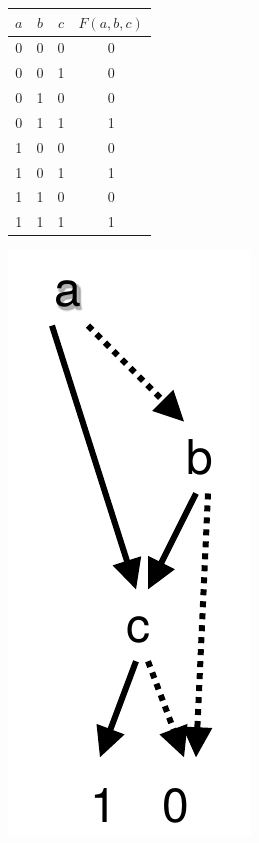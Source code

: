 \begin{container-fluid}
\begin{row-fluid}
\begin{span9}
\begin{center}
\begin{tabular}{|ccc|c|}
$a$ & $b$ & $c$ & $F(a,b,c)$\\
\hline
0 & 0 & 0 & 0\\
0 & 0 & 1 & 0\\
0 & 1 & 0 & 0\\
0 & 1 & 1 & 1\\
1 & 0 & 0 & 0\\
1 & 0 & 1 & 1\\
1 & 1 & 0 & 0\\
1 & 1 & 1 & 1\\
\end{tabular}
\end{center}
\end{span9}
\begin{span3}
\includegraphics{img/static/dd-dd.png}
\end{span3}
\end{row-fluid}
\end{container-fluid}

